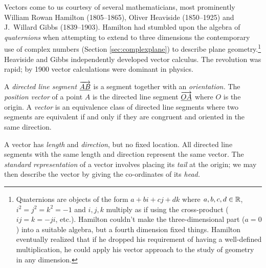 Vectors come to us courtesy of several mathematicians, most prominently William Rowan Hamilton (1805--1865), Oliver Heaviside (1850--1925) and J.~Willard Gibbs (1839--1903). Hamilton had stumbled upon the algebra of \emph{quaternions} when attempting to extend to three dimensions the contemporary use of complex numbers (Section \ref{sec:complexplane}) to describe plane geometry.\footnote{Quaternions are objects of the form $a+bi+cj+dk$ where $a,b,c,d\in\mathbb{R}$, $i^2=j^2=k^2=-1$ and $i,j,k$ multiply as if using the cross-product ($ij=k=-ji$, etc.). Hamilton couldn't make the three-dimensional part ($a=0$) into a suitable algebra, but a fourth dimension fixed things. Hamilton eventually realized that if he dropped his requirement of having a well-defined multiplication, he could apply his vector approach to the study of geometry in any dimension. %
} Heaviside and Gibbs %
independently developed vector calculus. The revolution was rapid; by 1900 vector calculations were dominant in physics. 

\begin{defn}{}{}
A \emph{directed line segment} $\overrightarrow{\underline{AB}}$ is a segment together with an \emph{orientation.}\footnotemark\smallbreak
The \emph{position vector} of a point $A$ is the directed line segment $\overrightarrow{\underline{OA}}$ where $O$ is the origin.\smallbreak
A \emph{vector} is an equivalence class of directed line segments where two segments are equivalent if and only if they are congruent and oriented in the same direction.
\end{defn}


A vector has \emph{length} and \emph{direction}, but no fixed location. All directed line segments with the same length and direction represent the same vector. The \emph{standard representation} of a vector involves placing its \emph{tail} at the origin; we may then describe the vector by giving the co-ordinates of its \emph{head.}

